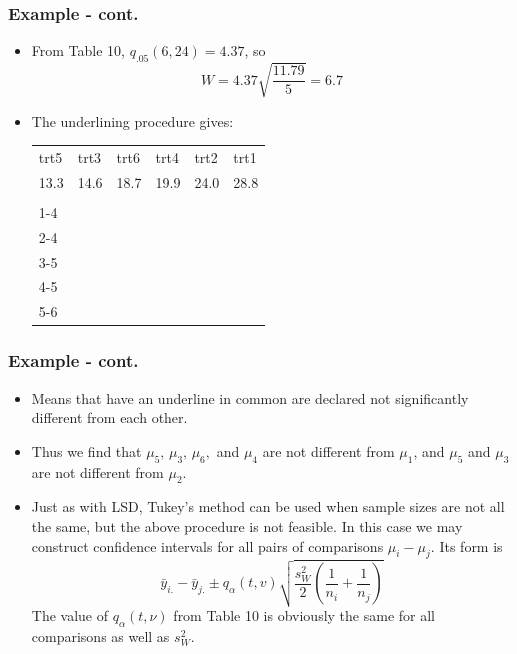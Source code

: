 \documentclass[xcolor=dvipsnames,12pt]{beamer}
\begin{document}
\begin{frame}
\frametitle{Example - cont.} 
\begin{itemize}
\item From Table 10, $q_{.05}(6,24) = 4.37$, so 
$$W = 4.37 \sqrt{\frac{11.79}{5}} = 6.7$$
\item The underlining procedure gives:\\[.01in]
\hspace*{1in}\begin{tabular}{llllll}
       trt5 & trt3 & trt6 & trt4 & trt2 & trt1 \\[.1in]
  13.3 & 14.6 & 18.7 & 19.9 & 24.0 & 28.8 \\[-0.2in]
       \\ \cline{1-4}\\[.0001in]
        \cline{2-4}\\[.0002in]
        \cline{3-5}\\[.0003in]
        \cline{4-5}\\[.0004in]
        \cline{5-6}\\
       \end{tabular}
\end{itemize}
\end{frame}

\begin{frame}
\frametitle{Example - cont.} 
\begin{itemize}
\item  Means that have an underline in common  are declared 
not significantly different from each other.
\item Thus we find that $\mu_5,\, \mu_3,\, \mu_6,$ and $ \mu_4 $ are not
different from $\mu_1$, and $\mu_5$ and $ \mu_3 $ are not different 
from $\mu_2$.
\item Just as with LSD, Tukey's method can be used when sample sizes are
not all the same, but the above procedure is not feasible.  In this 
case we may construct confidence intervals for all pairs of 
comparisons $\mu_i - \mu_j $.  Its form is
$$
\bar{y}_{i.} - \bar{y}_{j.} \pm q_\alpha (t,v) \sqrt{\frac{s_W^2}{2}
\left(\frac{1}{n_i} + \frac{1}{n_j} \right)        }
$$
The value of $q_\alpha (t,\nu)$ from Table 10 is obviously the same for 
all comparisons as well as $s_W^2$. \\[.1in]
\end{itemize}
\end{frame}
\end{document}
